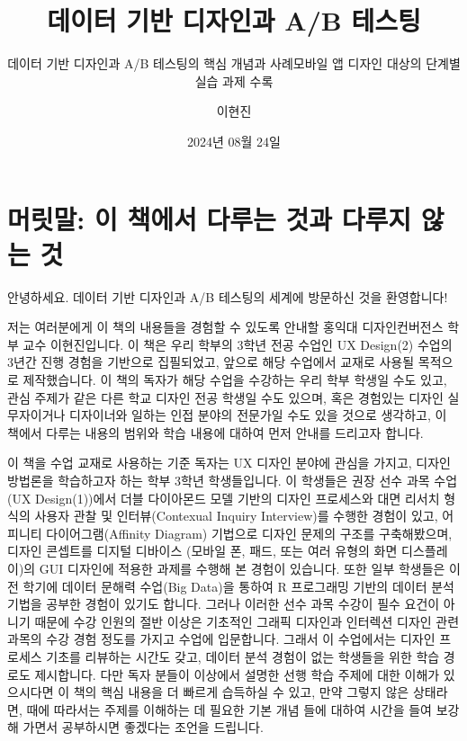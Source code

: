 \documentclass[
  letterpaper,
]{book}
\title{데이터 기반 디자인과 A/B 테스팅}
\subtitle{데이터 기반 디자인과 A/B 테스팅의 핵심 개념과 사례모바일 앱
디자인 대상의 단계별 실습 과제 수록}
\author{이현진}
\date{2024년 08월 24일}
\renewcommand*\contentsname{목차}
\newcommand\contentsname{목차}
\begin{document}
\frontmatter
\maketitle

\renewcommand*\contentsname{목차}
{
\hypersetup{linkcolor=}
\setcounter{tocdepth}{2}
\tableofcontents
}

\mainmatter
{}

\chapter{머릿말: 이 책에서 다루는 것과 다루지 않는
것}\label{uxba38uxb9bfuxb9d0-uxc774-uxcc45uxc5d0uxc11c-uxb2e4uxb8e8uxb294-uxac83uxacfc-uxb2e4uxb8e8uxc9c0-uxc54auxb294-uxac83}

안녕하세요. 데이터 기반 디자인과 A/B 테스팅의 세계에 방문하신 것을
환영합니다!

저는 여러분에게 이 책의 내용들을 경험할 수 있도록 안내할 홍익대
디자인컨버전스 학부 교수 이현진입니다. 이 책은 우리 학부의 3학년 전공
수업인 UX Design(2) 수업의 3년간 진행 경험을 기반으로 집필되었고, 앞으로
해당 수업에서 교재로 사용될 목적으로 제작했습니다. 이 책의 독자가 해당
수업을 수강하는 우리 학부 학생일 수도 있고, 관심 주제가 같은 다른 학교
디자인 전공 학생일 수도 있으며, 혹은 경험있는 디자인 실무자이거나
디자이너와 일하는 인접 분야의 전문가일 수도 있을 것으로 생각하고, 이
책에서 다루는 내용의 범위와 학습 내용에 대하여 먼저 안내를 드리고자
합니다.

이 책을 수업 교재로 사용하는 기준 독자는 UX 디자인 분야에 관심을 가지고,
디자인 방법론을 학습하고자 하는 학부 3학년 학생들입니다. 이 학생들은
권장 선수 과목 수업(UX Design(1))에서 더블 다이아몬드 모델 기반의 디자인
프로세스와 대면 리서치 형식의 사용자 관찰 및 인터뷰(Contexual Inquiry
Interview)를 수행한 경험이 있고, 어피니티 다이어그램(Affinity Diagram)
기법으로 디자인 문제의 구조를 구축해봤으며, 디자인 콘셉트를 디지털
디바이스 (모바일 폰, 패드, 또는 여러 유형의 화면 디스플레이)의 GUI
디자인에 적용한 과제를 수행해 본 경험이 있습니다. 또한 일부 학생들은
이전 학기에 데이터 문해력 수업(Big Data)을 통하여 R 프로그래밍 기반의
데이터 분석 기법을 공부한 경험이 있기도 합니다. 그러나 이러한 선수 과목
수강이 필수 요건이 아니기 때문에 수강 인원의 절반 이상은 기초적인 그래픽
디자인과 인터렉션 디자인 관련 과목의 수강 경험 정도를 가지고 수업에
입문합니다. 그래서 이 수업에서는 디자인 프로세스 기초를 리뷰하는 시간도
갖고, 데이터 분석 경험이 없는 학생들을 위한 학습 경로도 제시합니다. 다만
독자 분들이 이상에서 설명한 선행 학습 주제에 대한 이해가 있으시다면 이
책의 핵심 내용을 더 빠르게 습득하실 수 있고, 만약 그렇지 않은 상태라면,
때에 따라서는 주제를 이해하는 데 필요한 기본 개념 들에 대하여 시간을
들여 보강해 가면서 공부하시면 좋겠다는 조언을 드립니다.
\end{document}
